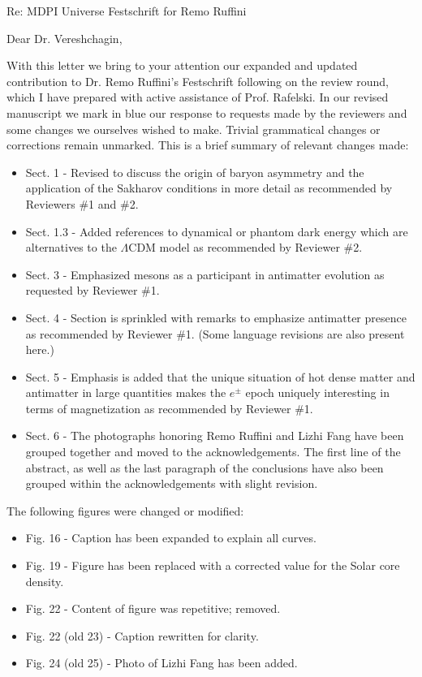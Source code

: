 \documentclass[a4paper, 10pt]{letter}
\begin{document}
\begin{letter}
{Re: MDPI Universe Festschrift for Remo Ruffini}

\opening{Dear Dr. Vereshchagin,}

With this letter we bring to your attention our expanded and updated contribution to Dr. Remo Ruffini's Festschrift following on the review round, which I have prepared with active assistance of Prof. Rafelski. In our revised manuscript we mark in blue our response to  requests made by the reviewers and some changes we ourselves wished to make. Trivial grammatical changes or corrections remain unmarked. This is a brief summary of relevant changes made:

\begin{itemize}
    \item Sect. 1 - Revised to discuss the origin of baryon asymmetry and the application of the Sakharov conditions in more detail as recommended by Reviewers \#1 and \#2.
    \item Sect. 1.3 - Added references to dynamical or phantom dark energy which are alternatives to the $\Lambda$CDM model as recommended by Reviewer \#2.
    \item Sect. 3 - Emphasized mesons as a participant in antimatter evolution as requested by Reviewer \#1.
    \item Sect. 4 - Section is sprinkled with remarks to emphasize antimatter presence as recommended by Reviewer \#1. (Some language revisions are also present here.)
    \item Sect. 5 - Emphasis is added that the unique situation of hot dense matter and antimatter in large quantities makes the $e^{\pm}$ epoch uniquely interesting in terms of magnetization as recommended by Reviewer \#1.
    \item Sect. 6 - The photographs honoring Remo Ruffini and Lizhi Fang have been grouped together and moved to the acknowledgements. The first line of the abstract, as well as the last paragraph of the conclusions have also been grouped within the acknowledgements with slight revision.
\end{itemize}

The following figures were changed or modified:
\begin{itemize}
    \item Fig. 16 - Caption has been expanded to explain all curves.
    \item Fig. 19 - Figure has been replaced with a corrected value for the Solar core density.
    \item Fig. 22 - Content of figure was repetitive; removed.
    \item Fig. 22 (old 23) - Caption rewritten for clarity.
    \item Fig. 24 (old 25) - Photo of Lizhi Fang has been added.
\end{itemize}


\end{letter}
\end{document}
